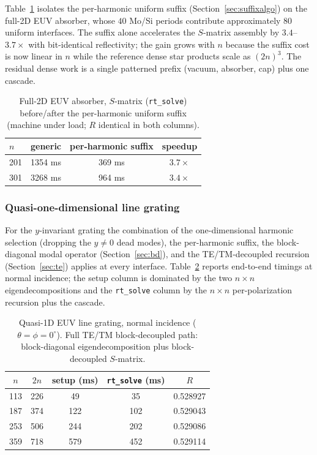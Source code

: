\documentclass[11pt]{article}
\theoremstyle{remark}
\begin{document}
Table~\ref{tab:perf} isolates the per-harmonic uniform suffix
(Section~\ref{sec:suffixalgo}) on the full-2D EUV absorber, whose $40$
Mo/Si periods contribute approximately $80$ uniform interfaces.  The suffix
alone accelerates the $S$-matrix assembly by $3.4$--$3.7\times$ with
bit-identical reflectivity; the gain grows with $n$ because the suffix cost is
now linear in $n$ while the reference dense star products scale as $(2n)^3$.
The residual dense work is a single patterned prefix (vacuum, absorber, cap)
plus one cascade.

\begin{table}[t]
\centering
\caption{Full-2D EUV absorber, $S$-matrix (\texttt{rt\_solve}) before/after the
per-harmonic uniform suffix (machine under load; $R$ identical in both
columns).}
\label{tab:perf}
\begin{tabular}{lccc}
\toprule
$n$ & generic & per-harmonic suffix & speedup\\
\midrule
201 & 1354 ms & 369 ms & $3.7\times$\\
301 & 3268 ms & 964 ms & $3.4\times$\\
\bottomrule
\end{tabular}
\end{table}

\subsubsection{Quasi-one-dimensional line grating}

For the $y$-invariant grating the combination of the one-dimensional harmonic
selection (dropping the $y\neq0$ dead modes), the per-harmonic suffix, the
block-diagonal modal operator (Section~\ref{sec:bd}), and the TE/TM-decoupled
recursion (Section~\ref{sec:te}) applies at every interface.  Table~\ref{tab:q1d}
reports end-to-end timings at normal incidence; the setup column is dominated
by the two $n\times n$ eigendecompositions and the \texttt{rt\_solve} column by
the $n\times n$ per-polarization recursion plus the cascade.

\begin{table}[t]
\centering
\caption{Quasi-1D EUV line grating, normal incidence ($\theta=\phi=0^\circ$).
Full TE/TM block-decoupled path: block-diagonal eigendecomposition plus
block-decoupled $S$-matrix.}
\label{tab:q1d}
\begin{tabular}{ccccc}
\toprule
$n$ & $2n$ & setup (ms) & \texttt{rt\_solve} (ms) & $R$\\
\midrule
113 & 226 & 49 & 35 & 0.528927\\
187 & 374 & 122 & 102 & 0.529043\\
253 & 506 & 244 & 202 & 0.529086\\
359 & 718 & 579 & 452 & 0.529114\\
\bottomrule
\end{tabular}
\end{table}
\end{document}
